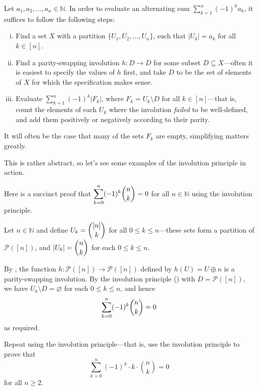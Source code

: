 \begin{strategy}
\label{strInvolutionPrinciple}
Let $a_1,a_2,\dots,a_n \in \mathbb{N}$. In order to evaluate an alternating sum $\displaystyle \sum_{k=1}^n (-1)^k a_k$, it suffices to follow the following steps:
\begin{enumerate}[(i)]
\item Find a set $X$ with a partition $\{ U_1, U_2, \dots, U_n \}$, such that $|U_k| = a_k$ for all $k \in [n]$.
\item Find a parity-swapping involution $h : D \to D$ for some subset $D \subseteq X$---often it is easiest to specify the values of $h$ first, and take $D$ to be the set of elements of $X$ for which the specification makes sense.
\item Evaluate $\displaystyle \sum_{k=1}^n (-1)^k |F_k|$, where $F_k = U_k \setminus D$ for all $k \in [n]$---that is, count the elements of each $U_k$ where the involution \textit{failed} to be well-defined, and add them positively or negatively according to their parity.
\end{enumerate}
It will often be the case that many of the sets $F_k$ are empty, simplifying matters greatly.
\end{strategy}

This is rather abstract, so let's see some examples of the involution principle in action.

\begin{example}
\label{exAlternatingSumOfBinomialsByInvolution}
Here is a succinct proof that $\displaystyle \sum_{k=0}^n (-1)^k \dbinom{n}{k} = 0$ for all $n \in \mathbb{N}$ using the involution principle.

Let $n \in \mathbb{N}$ and define $U_k = \dbinom{[n]}{k}$ for all $0 \le k \le n$---these sets form a partition of $\mathcal{P}([n])$, and $|U_k| = \dbinom{n}{k}$ for each $0 \le k \le n$.

By , the function $h : \mathcal{P}([n]) \to \mathcal{P}([n])$ defined by $h(U) = U \oplus n$ is a parity-swapping involution. By the involution principle () with $D=\mathcal{P}([n])$, we have $U_k \setminus D = \varnothing$ for each $0 \le k \le n$, and hence
\[ \sum_{k=0}^n (-1)^k \dbinom{n}{k} = 0 \]
as required.
\end{example}

\begin{exercise}
Repeat  using the involution principle---that is, use the involution principle to prove that
\[ \sum_{k=0}^n (-1)^k \cdot k \cdot \binom{n}{k} = 0 \]
for all $n \ge 2$.
\end{exercise}

